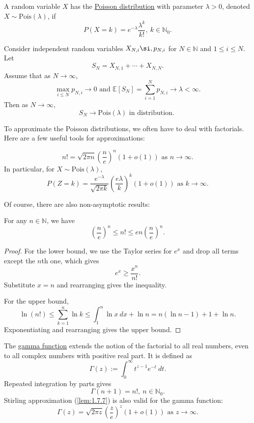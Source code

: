 \begin{definition}[]
\label{def:1.7.5}
A random variable $X$ has the \underline{Poisson distribution} with parameter $\lambda > 0$, denoted 
$X \sim \text{Pois}(\lambda)$, if 
\[ P(X = k) = e^{-\lambda} \frac{\lambda^k}{k!}, \ k \in \mathbb{N}_0. \]
\end{definition}

\begin{theorem}
\label{thm:1.7.6}
Consider independent random variables $X_{N, i} \si, p_{N, i}$ for $N \in \mathbb{N}$ and $1 \leq i \leq N$. 
Let 
\[ S_N = X_{N, 1} + \cdots + X_{N, N}. \]
Assume that as $N \to \infty$, 
\[ \max_{i \leq N} p_{N, i} \to 0 \text{  and  } \mathbb{E}[S_N] = \sum_{i = 1}^{N} p_{N, i} 
\to \lambda < \infty. \]
Then as $N \to \infty$, 
\[ S_N \to \text{Pois}(\lambda) \text{ in distribution. } \]
\end{theorem}

To approximate the Poisson distributions, we often have to deal with factorials. Here are a few useful tools 
for approximations:
\begin{lemma}
\label{lem:1.7.7}
\[ n! = \sqrt{2 \pi n} \left( \frac{n}{e} \right)^n (1 + o(1)) \text{ as } n\to \infty. \]
In particular, for $X \sim \text{Pois}(\lambda)$, 
\[ P(Z = k) = \frac{e^{-\lambda}}{\sqrt{2 \pi k}} \left( \frac{e \lambda}{k} \right)^k (1 + o(1)) 
\text{ as } k \to \infty. \]
\end{lemma}

Of course, there are also non-asymptotic results:
\begin{lemma}
\label{lem:1.7.8}
For any $n \in \mathbb{N}$, we have 
\[ \left( \frac{n}{e} \right)^n \leq n! \leq en \left( \frac{n}{e} \right)^n. \]
\end{lemma}

\begin{proof}
For the lower bound, we use the Taylor series for $e^x$ and drop all terms except the $n$th one, which 
gives 
\[ e^x \geq \frac{x^n}{n!}. \]
Substitute $x = n$ and rearranging gives the inequality.

For the upper bound, 
\[ \ln{(n!)} \leq \sum_{k = 1}^{n} \ln{k} \leq \int_{1}^{n} \ln{x} \ dx + \ln{n} 
= n(\ln{n} - 1) + 1 + \ln{n}. \]
Exponentiating and rearranging gives the upper bound.
\end{proof}

\begin{remark}
The \underline{gamma function} extends the notion of the factorial to all real numbers, even to all 
complex numbers with positive real part. It is defined as 
\[ \Gamma(z) := \int_{0}^{\infty} t^{z - 1}e^{-t} \ dt. \]
Repeated integration by parts gives 
\[ \Gamma(n + 1) = n!, \ n \in \mathbb{N}_0. \]
Stirling approximation (\cref{lem:1.7.7}) is also valid for the gamma function:
\[ \Gamma(z) = \sqrt{2 \pi z} \left( \frac{z}{e} \right)^z (1 + o(1)) \text{ as } z \to \infty. \]
\end{remark}


